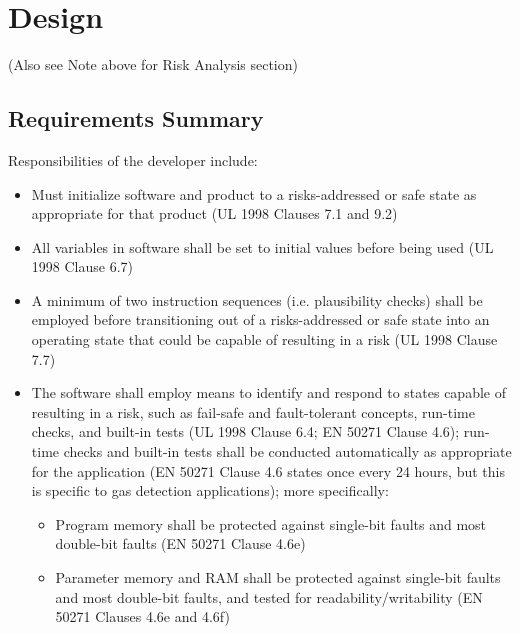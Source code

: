 \documentclass[12pt]{../Common_files/ElisaPaper}
\begin{document}
\section{Design}

(Also see Note above for Risk Analysis section)

\subsection{Requirements Summary}
Responsibilities of the developer include:

\begin{itemize}

\item Must initialize software and product to a risks-addressed or safe state as appropriate for that product (UL 1998 \cite{UL1998} Clauses 7.1 and 9.2)

\item All variables in software shall be set to initial values before being used (UL 1998 \cite{UL1998} Clause 6.7)

\item A minimum of two instruction sequences (i.e. plausibility checks) shall be employed before transitioning out of a risks-addressed or safe state into an operating state that could be capable of resulting in a risk (UL 1998 \cite{UL1998} Clause 7.7)

\item The software shall employ means to identify and respond to states capable of resulting in a risk, such as fail-safe and fault-tolerant concepts, run-time checks, and built-in tests (UL 1998 \cite{UL1998} Clause 6.4; EN 50271 \cite{EN50271} Clause 4.6); run-time checks and built-in tests shall be conducted automatically as appropriate for the application (EN 50271 \cite{EN50271} Clause 4.6 states once every 24 hours, but this is specific to gas detection applications); more specifically:

\begin{itemize}

\item Program memory shall be protected against single-bit faults and most double-bit faults (EN 50271 \cite{EN50271} Clause 4.6e)

\item Parameter memory and RAM shall be protected against single-bit faults and most  double-bit faults, and tested for readability/writability (EN 50271 \cite{EN50271} Clauses 4.6e and 4.6f)


\end{itemize}
\end{itemize}
\end{document}
